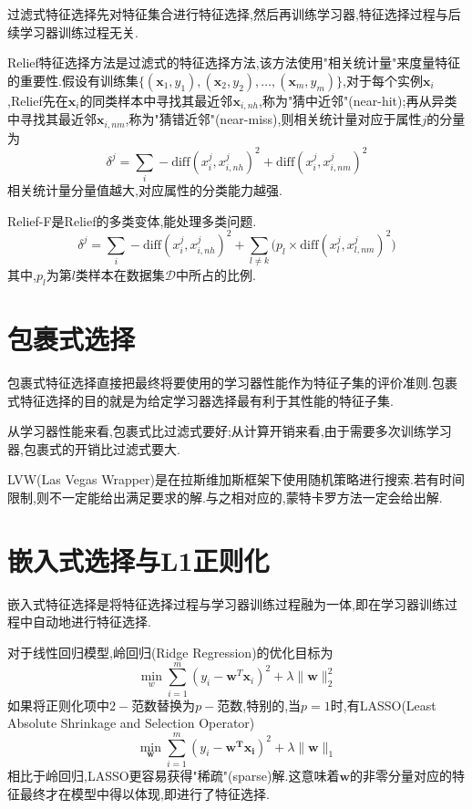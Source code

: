 过滤式特征选择先对特征集合进行特征选择,然后再训练学习器,特征选择过程与后续学习器训练过程无关.

Relief特征选择方法是过滤式的特征选择方法,该方法使用"相关统计量"来度量特征的重要性.假设有训练集$\{(\mathbf{x}_1, y_1),(\mathbf{x}_2, y_2),\dots,(\mathbf{x}_m, y_m)\}$,对于每个实例$\mathbf{x}_i$,Relief先在$\mathbf{x}_i$的同类样本中寻找其最近邻$\mathbf{x}_{i,nh}$,称为"猜中近邻"(near-hit);再从异类中寻找其最近邻$\mathbf{x}_{i,nm}$,称为"猜错近邻"(near-miss),则相关统计量对应于属性$j$的分量为
\begin{equation}
\delta^j=\sum_i-\text{diff}(x_i^j,x_{i,nh}^j)^2+\text{diff}(x_i^j,x_{i,nm}^j)^2
\end{equation}
相关统计量分量值越大,对应属性的分类能力越强.

Relief-F是Relief的多类变体,能处理多类问题.
\begin{equation}
\delta^j=\sum_i-\text{diff}(x_i^j,x_{i,nh}^j)^2+\sum_{l\ne k}\Big(p_l\times\text{diff}(x_l^j,x_{l,nm}^j)^2\Big)
\end{equation}
其中,$p_l$为第$l$类样本在数据集$\mathcal{D}$中所占的比例.

\section{包裹式选择}

包裹式特征选择直接把最终将要使用的学习器性能作为特征子集的评价准则.包裹式特征选择的目的就是为给定学习器选择最有利于其性能的特征子集.

从学习器性能来看,包裹式比过滤式要好;从计算开销来看,由于需要多次训练学习器,包裹式的开销比过滤式要大.

LVW(Las Vegas Wrapper)是在拉斯维加斯框架下使用随机策略进行搜索.若有时间限制,则不一定能给出满足要求的解.与之相对应的,蒙特卡罗方法一定会给出解.

\section{嵌入式选择与L1正则化}

嵌入式特征选择是将特征选择过程与学习器训练过程融为一体,即在学习器训练过程中自动地进行特征选择.

对于线性回归模型,岭回归(Ridge Regression)的优化目标为
\begin{equation}
\min_{w}\sum_{i=1}^m(y_i-\mathbf{w}^T\mathbf{x}_i)^2+\lambda\|\mathbf{w}\|_2^2
\end{equation}
如果将正则化项中$2-$范数替换为$p-$范数,特别的,当$p=1$时,有LASSO(Least Absolute Shrinkage and Selection Operator)
\begin{equation}
\min_{\mathbf{w}}\sum_{i=1}^m(y_i-\mathbf{w^Tx_i})^2+\lambda\|\mathbf{w}\|_1
\end{equation}
相比于岭回归,LASSO更容易获得"稀疏"(sparse)解.这意味着$\mathbf{w}$的非零分量对应的特征最终才在模型中得以体现,即进行了特征选择.

